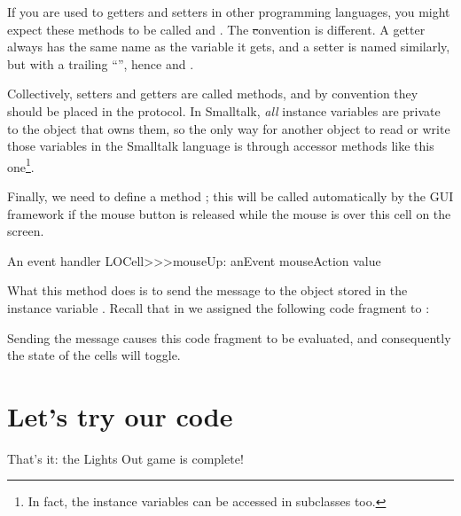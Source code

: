\documentclass[a4paper,10pt,twoside]{book}
\begin{document}
If you are used to getters and setters in other programming languages, you might expect these methods to be called  and .
The \st convention is different.
A getter always has the same name as the variable it gets, and a setter is named similarly, but with a trailing ``\ct{:}'', hence  and .

Collectively, setters and getters are called   methods, and by convention they should be placed in the  protocol.
In Smalltalk, \emph{all} instance variables are private to the object that owns them, so the only way for another object to read or write those variables in the Smalltalk language is through accessor methods like this one\footnote{In fact, the instance variables can be accessed in subclasses too.}.


Finally, we need to define a method ; this will be called automatically by the GUI framework if the mouse button is released while the mouse is over this cell on the screen.

\begin{method}[sbecellmouseup]{An event handler}
LOCell>>>mouseUp: anEvent
   mouseAction value
\end{method}


What this method does is to send the message  to the object stored in the instance variable . 
Recall that in  we assigned the following code fragment to :


\noindent
Sending the  message causes this code fragment to be evaluated, and consequently the state of the cells will toggle.

\section{Let's try our code}

That's it: the Lights Out game is complete!
\end{document}
